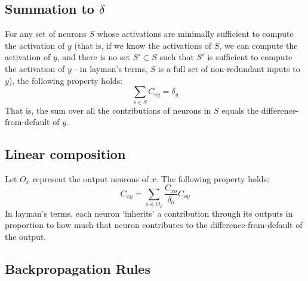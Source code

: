 \documentclass{article}
\begin{document}
\subsection{Summation to $\delta$}

For any set of neurons $S$ whose activations are minimally sufficient to compute the activation of $y$ (that is, if we know the activations of $S$, we can compute the activation of $y$, and there is no set $S' \subset S$ such that $S'$ is sufficient to compute the activation of $y$ - in layman's terms, $S$ is a full set of non-redundant inputs to $y$), the following property holds:
\begin{equation}
\sum_{s \in S} C_{sy} = \delta_y
\end{equation}
That is, the sum over all the contributions of neurons in $S$ equals the difference-from-default of $y$.

\subsection{Linear composition}

Let $O_x$ represent the output neurons of $x$. The following property holds:\\
\begin{equation}
C_{xy} = \sum_{o \in O_x} \frac{C_{xo}}{\delta_o}C_{oy}
\end{equation}
In layman's terms, each neuron `inherits' a contribution through its outputs in proportion to how much that neuron contributes to the difference-from-default of the output.

\subsection{Backpropagation Rules}
\end{document}
